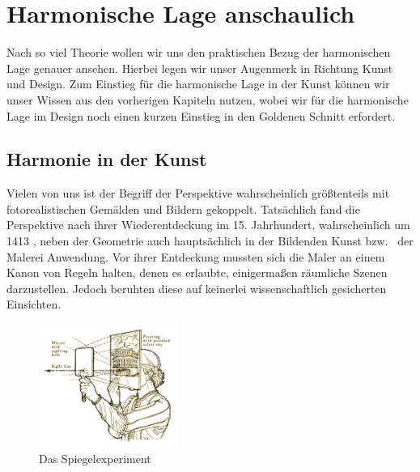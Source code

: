 \documentclass[12pt,a4paper]{article}
\begin{document}
\newpage
\section{Harmonische Lage anschaulich}

Nach so viel Theorie wollen wir uns den praktischen Bezug der harmonischen Lage genauer ansehen. Hierbei legen wir unser Augenmerk in Richtung Kunst und Design. Zum Einstieg für die harmonische Lage in der Kunst können wir unser Wissen aus den vorherigen Kapiteln nutzen, wobei wir für die harmonische Lage im Design noch einen kurzen Einstieg in den Goldenen Schnitt erfordert.

\subsection{Harmonie in der Kunst}

Vielen von uns ist der Begriff der Perspektive wahrscheinlich größtenteils mit fotorealistischen Gemälden und Bildern gekoppelt. Tatsächlich fand die Perspektive nach ihrer Wiederentdeckung im 15. Jahrhundert, wahrscheinlich um 1413 \citep[S.~27]{perspektive}, neben der Geometrie auch hauptsächlich in der Bildenden Kunst bzw.~ der Malerei Anwendung. Vor ihrer Entdeckung mussten sich die Maler an einem Kanon von Regeln halten, denen es erlaubte, einigermaßen räumliche Szenen darzustellen. Jedoch beruhten diese auf keinerlei wissenschaftlich gesicherten Einsichten.

\begin{figure}
\centering
\includegraphics[width=0.4\textwidth]{Bilder/Brunelleschi-Zentralperspektive.jpg}
\caption{Das  Spiegelexperiment}%
\label{fig:brunnelli1}
\end{figure}
\end{document}
